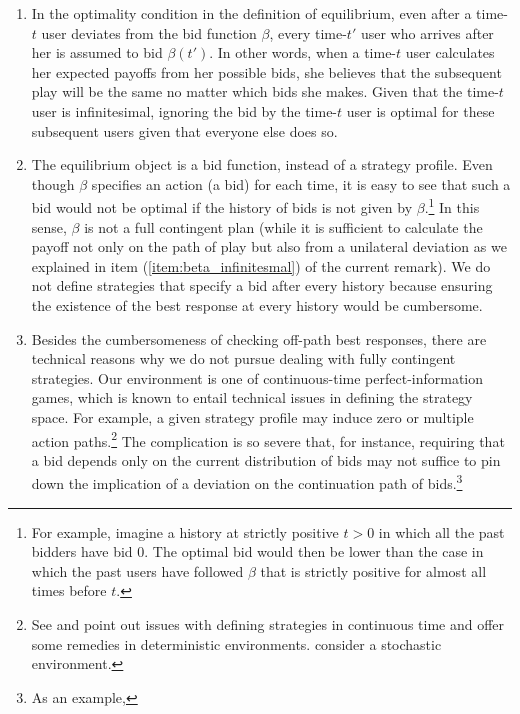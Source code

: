 \documentclass[12pt, letterpaper]{article}
\begin{document}
\begin{remark}\label{remark: bid function}
\quad

\begin{enumerate}
\item\label{item:beta_infinitesmal}
In the optimality condition in the definition of equilibrium, even after a time-$t$ user deviates from the bid function $\beta$, every time-$t'$ user who arrives after her is assumed to bid $\beta(t')$. In other words, when a time-$t$ user calculates her expected payoffs from her possible bids, she believes that the subsequent play will be the same no matter which bids she makes. Given that the time-$t$ user is infinitesimal, ignoring the bid by the time-$t$ user is optimal for these subsequent users given that everyone else does so.
\item
The equilibrium object is a bid function, instead of a strategy profile. Even though $\beta$ specifies an action (a bid) for each time, it is easy to see that such a bid would not be optimal if the history of bids is not given by $\beta$.\footnote{For example, imagine a history at strictly positive $t>0$ in which all the past bidders have bid 0. The optimal bid would then be lower than the case in which the past users have followed $\beta$ that is strictly positive for almost all times before $t$.} In this sense, $\beta$ is not a full contingent plan (while it is sufficient to calculate the payoff not only on the path of play but also from a unilateral deviation as we explained in item (\ref{item:beta_infinitesmal}) of the current remark). We do not define strategies that specify a bid after every history because ensuring the existence of the best response at every history would be cumbersome.
\item
Besides the cumbersomeness of checking off-path best responses, there are technical reasons why we do not pursue dealing with fully contingent strategies. Our environment is one of continuous-time perfect-information games, which is known to entail technical issues in defining the strategy space. For example, a given strategy profile may induce zero or multiple action paths.\footnote{See \citet{simon1989extensive} and \citet{bergin1993continuous} point out issues with defining strategies in continuous time and offer some remedies in deterministic environments. 
\citet{KamadaRaoContinuous} consider a stochastic environment.} The complication is so severe that, for instance, requiring that a bid depends only on the current distribution of bids may not suffice to pin down the implication of a deviation on the continuation path of bids.\footnote{As an example, 
}
\end{enumerate}
\end{remark}
\end{document}
